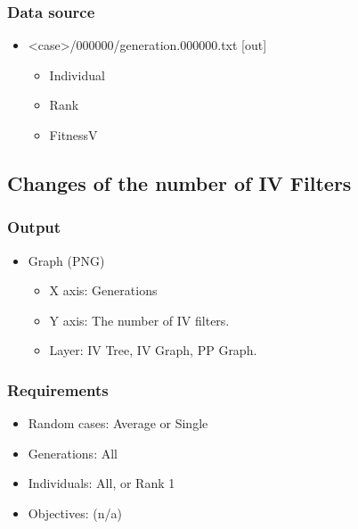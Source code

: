 \documentclass[]{article}
\begin{document}
\subsubsection{Data source}\label{data-source}

\begin{itemize}
\itemsep1pt\parskip0pt
\item
  \textless{}case\textgreater{}/000000/generation.000000.txt {[}out{]}

  \begin{itemize}
  \itemsep1pt\parskip0pt
  \item
    Individual
  \item
    Rank
  \item
    FitnessV
  \end{itemize}
\end{itemize}

\subsection{Changes of the number of IV
Filters}\label{changes-of-the-number-of-iv-filters}

\subsubsection{Output}\label{output-1}

\begin{itemize}
\itemsep1pt\parskip0pt
\item
  Graph (PNG)

  \begin{itemize}
  \itemsep1pt\parskip0pt
  \item
    X axis: Generations
  \item
    Y axis: The number of IV filters.
  \item
    Layer: IV Tree, IV Graph, PP Graph.
  \end{itemize}
\end{itemize}

\subsubsection{Requirements}\label{requirements-1}

\begin{itemize}
\itemsep1pt\parskip0pt
\item
  Random cases: Average or Single
\item
  Generations: All
\item
  Individuals: All, or Rank 1
\item
  Objectives: (n/a)
\end{itemize}
\end{document}
